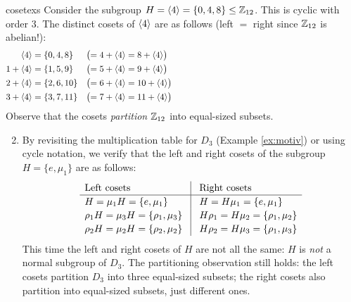 \begin{examples}{}{cosetexs}
	\exstart\label{ex:cosets1} Consider the subgroup $H=\left\langle 4\right\rangle=\{0,4,8\}\le\mathbb{Z}_{12}$. This is cyclic with order 3. The distinct cosets of $\left\langle 4\right\rangle$ are as follows (left $=$ right since $\mathbb{Z}_{12}$ is abelian!):
	\begin{align*}
	\ip 4 &=\{0,4,8\}&&\bigl(=4+\ip 4=8+\ip 4\bigr) \hspace{220pt}\\
	1+\ip 4 &=\{1,5,9\}&&\bigl(=5+\ip 4=9+\ip 4\bigr)\\
	2+\ip 4 &=\{2,6,10\}&&\bigl(=6+\ip 4=10+\ip 4\bigr)\\
	3+\ip 4 &=\{3,7,11\}&&\bigl(=7+\ip 4=11+\ip 4\bigr)
	\end{align*}
	Observe that the cosets \emph{partition} $\mathbb{Z}_{12}$ into equal-sized subsets.

	\begin{enumerate}\setcounter{enumi}{1}
		\item\label{ex:nonnormalcosets} By revisiting the multiplication table for $D_3$ (Example \ref{ex:motiv}) or using cycle notation, we verify that the left and right cosets of the subgroup $H=\{e,\mu_1\}$ are as follows:
		\[\renewcommand{\arraystretch}{1.15}\begin{array}{l@{\hspace*{.3cm}}|@{\hspace*{.3cm}}l}
	  	\text{Left cosets} & \text{Right cosets}\\\hline
			H=\mu_1H=\{e,\mu_1\}& H=H\mu_1=\{e,\mu_1\}\\
			\rho_1H=\mu_3H=\{\rho_1,\mu_3\} & H\rho_1=H\mu_2=\{\rho_1,\mu_2\}\\
			\rho_2H=\mu_2H=\{\rho_2,\mu_2\} & H\rho_2=H\mu_3=\{\rho_1,\mu_3\}
		\end{array}\]
	This time the left and right cosets of $H$ are not all the same: $H$ is \emph{not} a normal subgroup of $D_3$. The partitioning observation still holds: the left cosets partition $D_3$ into three equal-sized subsets; the right cosets also partition into equal-sized subsets, just different ones.
	

\end{enumerate}
\end{examples}
